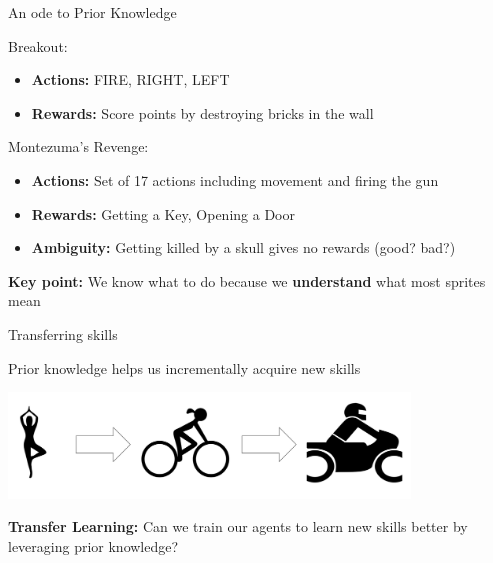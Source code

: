 \documentclass[aspectratio=169]{../latex_main/tntbeamer}  %
\begin{document}
\begin{frame}{An ode to Prior Knowledge}

    Breakout:
    \begin{itemize}
        \item \textbf{Actions:} FIRE, RIGHT, LEFT
        \item \textbf{Rewards:} Score points by destroying bricks in the wall
    \end{itemize}
    
    \vfill
    
    Montezuma's Revenge:
    \begin{itemize}
        \item \textbf{Actions:} Set of 17 actions including movement and firing the gun
        \item \textbf{Rewards:} Getting a Key, Opening a Door
        \item \textbf{Ambiguity:} Getting killed by a skull gives no rewards (good? bad?)
    \end{itemize}
    
    \vfill
    \pause
    \noindent
    \textbf{Key point:} We know what to do because we \textbf{understand} what most sprites mean

\end{frame}

\begin{frame}{Transferring skills}

    Prior knowledge helps us incrementally acquire new skills
    \vfill
    
    \begin{center}
        \includegraphics[width=0.8\textwidth]{images/t01/transfer.png} %
    \end{center}
    
    \vfill
    \pause
    \textbf{Transfer Learning:} Can we train our agents to learn new skills better by leveraging prior knowledge?
    

\end{frame}
\end{document}
